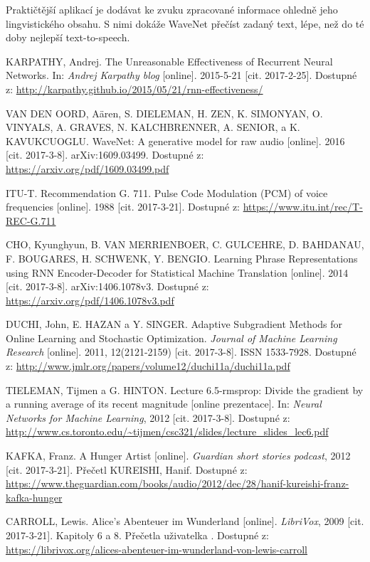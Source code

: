 \documentclass[a4]{article}
\begin{document}
Praktičtější aplikací je dodávat ke zvuku zpracované informace ohledně jeho lingvistického obsahu. S nimi dokáže WaveNet přečíst zadaný text, lépe, než do té doby nejlepší text-to-speech.

\begin{thebibliography}{9}

KARPATHY, Andrej.
The Unreasonable Effectiveness of Recurrent Neural Networks.
In: \textit{Andrej Karpathy blog} [online].
2015-5-21 [cit. 2017-2-25].
Dostupné z: \url{http://karpathy.github.io/2015/05/21/rnn-effectiveness/}

VAN DEN OORD, Aären, S. DIELEMAN, H. ZEN, K. SIMONYAN, O. VINYALS, A. GRAVES, N. KALCHBRENNER, A. SENIOR, a K. KAVUKCUOGLU.
WaveNet: A generative model for raw audio [online].
2016 [cit. 2017-3-8].
arXiv:1609.03499.
Dostupné z: \url{https://arxiv.org/pdf/1609.03499.pdf}

ITU-T.
Recommendation G. 711. Pulse Code Modulation (PCM) of voice frequencies [online].
1988 [cit. 2017-3-21].
Dostupné z: \url{https://www.itu.int/rec/T-REC-G.711}

CHO, Kyunghyun, B. VAN MERRIENBOER, C. GULCEHRE, D. BAHDANAU, F. BOUGARES, H. SCHWENK, Y. BENGIO.
Learning Phrase Representations using RNN Encoder-Decoder for Statistical Machine Translation [online].
2014 [cit. 2017-3-8].
arXiv:1406.1078v3.
Dostupné z: \url{https://arxiv.org/pdf/1406.1078v3.pdf}

DUCHI, John, E. HAZAN a Y. SINGER.
Adaptive Subgradient Methods for Online Learning and Stochastic Optimization.
\textit{Journal of Machine Learning Research} [online].
2011, 12(2121-2159) [cit. 2017-3-8].
ISSN 1533-7928.
Dostupné z: \url{http://www.jmlr.org/papers/volume12/duchi11a/duchi11a.pdf}

TIELEMAN, Tijmen a G. HINTON.
Lecture 6.5-rmsprop: Divide the gradient by a running average of its recent magnitude [online prezentace].
In: \textit{Neural Networks for Machine Learning}, 2012 [cit. 2017-3-8].
Dostupné z: \url{http://www.cs.toronto.edu/~tijmen/csc321/slides/lecture_slides_lec6.pdf}

KAFKA, Franz.
A Hunger Artist [online].
\textit{Guardian short stories podcast}, 2012 [cit. 2017-3-21].
Přečetl KUREISHI, Hanif.
Dostupné z: \url{https://www.theguardian.com/books/audio/2012/dec/28/hanif-kureishi-franz-kafka-hunger}

CARROLL, Lewis.
Alice's Abenteuer im Wunderland [online].
\textit{LibriVox}, 2009 [cit. 2017-3-21].
Kapitoly 6 a 8. Přečetla uživatelka .
Dostupné z: \url{https://librivox.org/alices-abenteuer-im-wunderland-von-lewis-carroll}

\end{thebibliography}
\end{document}
